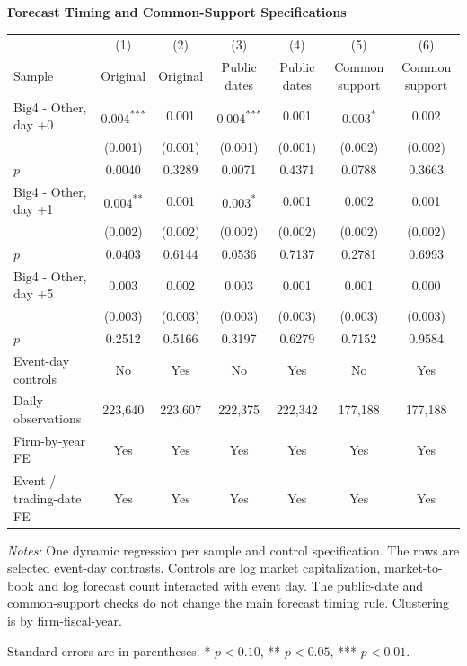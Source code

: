 \documentclass[10pt]{article}
\newcommand{\sym}[1]{\textsuperscript{#1}}
\begin{document}
\begin{minipage}{23.60cm}
\fontsize{10}{12}\selectfont
\setlength{\tabcolsep}{4pt}\renewcommand{\arraystretch}{1.08}
{\large\bfseries Forecast Timing and Common-Support Specifications}\par\medskip
\begin{tabular*}{\linewidth}{@{\extracolsep{\fill}}lcccccc@{}}
\toprule
 & (1) & (2) & (3) & (4) & (5) & (6) \\
Sample & Original & Original & Public dates & Public dates & Common support & Common support \\
\midrule
Big4 - Other, day +0 & 0.004\sym{***} & 0.001 & 0.004\sym{***} & 0.001 & 0.003\sym{*} & 0.002 \\
 & (0.001) & (0.001) & (0.001) & (0.001) & (0.002) & (0.002) \\
$p$ & 0.0040 & 0.3289 & 0.0071 & 0.4371 & 0.0788 & 0.3663 \\
Big4 - Other, day +1 & 0.004\sym{**} & 0.001 & 0.003\sym{*} & 0.001 & 0.002 & 0.001 \\
 & (0.002) & (0.002) & (0.002) & (0.002) & (0.002) & (0.002) \\
$p$ & 0.0403 & 0.6144 & 0.0536 & 0.7137 & 0.2781 & 0.6993 \\
Big4 - Other, day +5 & 0.003 & 0.002 & 0.003 & 0.001 & 0.001 & 0.000 \\
 & (0.003) & (0.003) & (0.003) & (0.003) & (0.003) & (0.003) \\
$p$ & 0.2512 & 0.5166 & 0.3197 & 0.6279 & 0.7152 & 0.9584 \\
\midrule
Event-day controls & No & Yes & No & Yes & No & Yes \\
Daily observations & 223,640 & 223,607 & 222,375 & 222,342 & 177,188 & 177,188 \\
Firm-by-year FE & Yes & Yes & Yes & Yes & Yes & Yes \\
Event / trading-date FE & Yes & Yes & Yes & Yes & Yes & Yes \\
\bottomrule\end{tabular*}\par\medskip
\fontsize{9}{11}\selectfont\textit{Notes:} One dynamic regression per sample and control specification. The rows are selected event-day contrasts. Controls are log market capitalization, market-to-book and log forecast count interacted with event day. The public-date and common-support checks do not change the main forecast timing rule. Clustering is by firm-fiscal-year.
\par Standard errors are in parentheses. * $p<0.10$, ** $p<0.05$, *** $p<0.01$.
\end{minipage}
\end{document}
